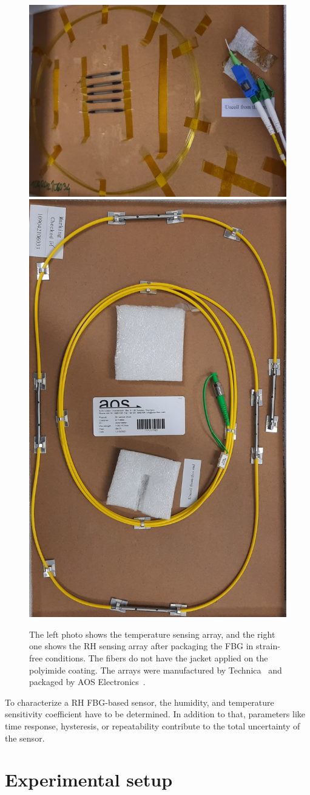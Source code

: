 \begin{figure}[!h]
\centering
\includegraphics[angle=90,width=0.43\columnwidth]{Chapter5/images/t_array1.jpg}
\includegraphics[angle=90,width=0.52\columnwidth]{Chapter5/images/rh_array1.jpg}
\caption{The left photo shows the temperature sensing array, and the right one shows the \gls{RH} sensing array after packaging the FBG in strain-free conditions. The fibers do not have the jacket applied on the polyimide coating. The arrays were manufactured by Technica~\cite{technica} and packaged by AOS Electronics~\cite{AOS}.}
\label{fig_array_photo}
\end{figure}
To characterize a RH FBG-based sensor, the humidity, and temperature sensitivity coefficient have to be determined. In addition to that, parameters like time response, hysteresis, or repeatability contribute to the total uncertainty of the sensor. 
\section{Experimental setup}
\label{fos:setup}

